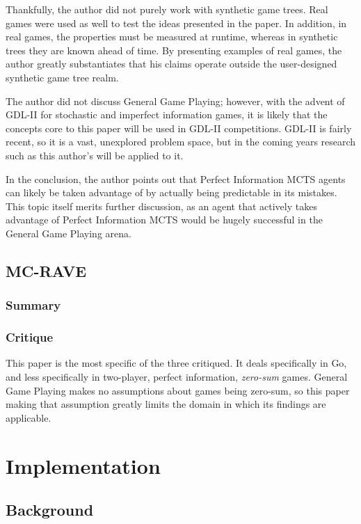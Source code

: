 \documentclass[letterpaper]{article}
\begin{document}
Thankfully, the author did not purely work with synthetic game trees. Real games were used as well to test the ideas presented in the paper. In addition, in real games, the properties must be measured at runtime, whereas in synthetic trees they are known ahead of time. By presenting examples of real games, the author greatly substantiates that his claims operate outside the user-designed synthetic game tree realm.

The author did not discuss General Game Playing; however, with the advent of GDL-II for stochastic and imperfect information games, it is likely that the concepts core to this paper will be used in GDL-II competitions. GDL-II is fairly recent, so it is a vast, unexplored problem space, but in the coming years research such as this author's will be applied to it.

In the conclusion, the author points out that Perfect Information MCTS agents can likely be taken advantage of by actually being predictable in its mistakes. This topic itself merits further discussion, as an agent that actively takes advantage of Perfect Information MCTS would be hugely successful in the General Game Playing arena.

\subsection{MC-RAVE}

\subsubsection{Summary}


\subsubsection{Critique}
This paper is the most specific of the three critiqued. It deals specifically in Go, and less specifically in two-player, perfect information, \emph{zero-sum} games. General Game Playing makes no assumptions about games being zero-sum, so this paper making that assumption greatly limits the domain in which its findings are applicable.

\section{Implementation}

\subsection{Background}
\end{document}
